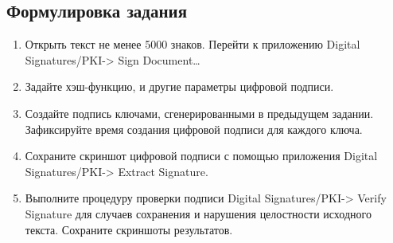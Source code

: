 \documentclass[a4paper, 14pt]{extarticle}
\begin{document}
\subsection{Формулировка задания}
\begin{enumerate}
    \item Открыть текст не менее 5000 знаков. Перейти к приложению Digital Signatures/PKI-> Sign Document…
    \item Задайте хэш-функцию, и другие параметры цифровой подписи.
    \item Создайте подпись ключами, сгенерированными в предыдущем задании. Зафиксируйте время создания цифровой подписи для каждого ключа.
    \item Сохраните скриншот цифровой подписи с помощью приложения Digital Signatures/PKI-> Extract Signature.
    \item Выполните процедуру проверки подписи Digital Signatures/PKI-> Verify Signature для случаев сохранения и нарушения целостности исходного текста. Сохраните скриншоты результатов.
\end{enumerate}
\end{document}
